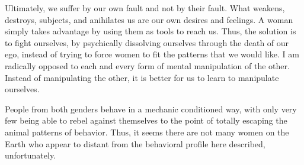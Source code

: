 Ultimately, we suffer by our own fault and not by their fault.
What weakens, destroys, subjects, and anihilates us are our own desires and feelings.
A woman simply takes advantage by using them as tools to reach us.
Thus, the solution is to fight ourselves, by psychically dissolving ourselves through the death of our ego, instead of trying to force women to fit the patterns that we would like.
I am radically opposed to each and every form of mental manipulation of the other.
Instead of manipulating the other, it is better for us to learn to manipulate ourselves.

People from both genders behave in a mechanic conditioned way, with only very few being able to rebel against themselves to the point of totally escaping the animal patterns of behavior.
Thus, it seems there are not many women on the Earth who appear to distant from the behavioral profile here described, unfortunately.